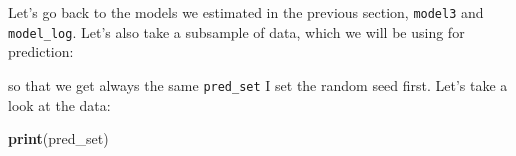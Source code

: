 \documentclass[]{gitbook}
\newenvironment{Shaded}{\begin{snugshade}}{\end{snugshade}}
\newcommand{\DecValTok}[1]{\textcolor[rgb]{0.00,0.00,0.81}{#1}}
\newcommand{\KeywordTok}[1]{\textcolor[rgb]{0.13,0.29,0.53}{\textbf{#1}}}
\newcommand{\NormalTok}[1]{#1}
\newcommand{\OperatorTok}[1]{\textcolor[rgb]{0.81,0.36,0.00}{\textbf{#1}}}
\newcommand{\StringTok}[1]{\textcolor[rgb]{0.31,0.60,0.02}{#1}}
\begin{document}
Let's go back to the models we estimated in the previous section, \texttt{model3} and \texttt{model\_log}. Let's also
take a subsample of data, which we will be using for prediction:

\begin{Shaded}
\end{Shaded}

so that we get always the same \texttt{pred\_set} I set the random seed first. Let's take a look at the
data:

\begin{Shaded}
\begin{Highlighting}[]
\KeywordTok{print}\NormalTok{(pred_set)}
\end{Highlighting}
\end{Shaded}
\end{document}
